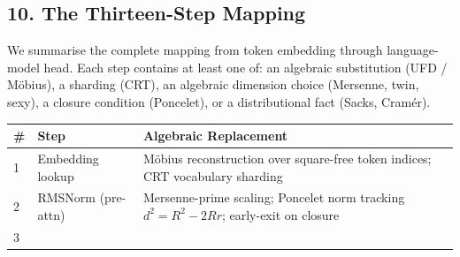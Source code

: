 \documentclass[
  11pt,
]{article}
\begin{document}
\hypertarget{the-thirteen-step-mapping}{%
\subsection{10. The Thirteen-Step
Mapping}\label{the-thirteen-step-mapping}}

We summarise the complete mapping from token embedding through
language-model head. Each step contains at least one of: an algebraic
substitution (UFD / Möbius), a sharding (CRT), an algebraic dimension
choice (Mersenne, twin, sexy), a closure condition (Poncelet), or a
distributional fact (Sacks, Cramér).

\begin{longtable}[]{@{}lll@{}}
\toprule
\begin{minipage}[b]{0.08\columnwidth}\raggedright
\#\strut
\end{minipage} & \begin{minipage}[b]{0.17\columnwidth}\raggedright
Step\strut
\end{minipage} & \begin{minipage}[b]{0.66\columnwidth}\raggedright
Algebraic Replacement\strut
\end{minipage}\tabularnewline
\midrule
\endhead
\begin{minipage}[t]{0.08\columnwidth}\raggedright
1\strut
\end{minipage} & \begin{minipage}[t]{0.17\columnwidth}\raggedright
Embedding lookup\strut
\end{minipage} & \begin{minipage}[t]{0.66\columnwidth}\raggedright
Möbius reconstruction over square-free token indices; CRT vocabulary
sharding\strut
\end{minipage}\tabularnewline
\begin{minipage}[t]{0.08\columnwidth}\raggedright
2\strut
\end{minipage} & \begin{minipage}[t]{0.17\columnwidth}\raggedright
RMSNorm (pre-attn)\strut
\end{minipage} & \begin{minipage}[t]{0.66\columnwidth}\raggedright
Mersenne-prime scaling; Poncelet norm tracking \(d^2 = R^2 - 2Rr\);
early-exit on closure\strut
\end{minipage}\tabularnewline
\begin{minipage}[t]{0.08\columnwidth}\raggedright
3\strut
\end{minipage} & \begin{minipage}[t]{0.17\columnwidth}\raggedright

\end{minipage}
\end{longtable}
\end{document}
